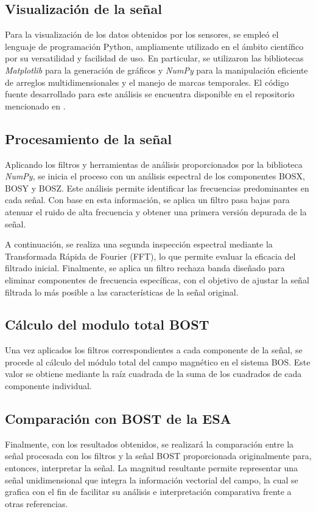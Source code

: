 \documentclass[letterpaper,11pt]{article}
\begin{document}
        \subsection{Visualización de la señal}
	Para la visualización de los datos obtenidos por los sensores, se empleó el lenguaje de programación Python, ampliamente utilizado en el ámbito científico por su versatilidad y facilidad de uso. En particular, se utilizaron las bibliotecas \textit{Matplotlib} para la generación de gráficos y \textit{NumPy} para la manipulación eficiente de arreglos multidimensionales y el manejo de marcas temporales. El código fuente desarrollado para este análisis se encuentra disponible en el repositorio mencionado en \cite{repogithub}.

        \subsection{Procesamiento de la señal}
	Aplicando los filtros y herramientas de análisis proporcionados por la biblioteca \textit{NumPy}, se inicia el proceso con un análisis espectral de los componentes BOSX, BOSY y BOSZ. Este análisis permite identificar las frecuencias predominantes en cada señal. Con base en esta información, se aplica un filtro pasa bajas para atenuar el ruido de alta frecuencia y obtener una primera versión depurada de la señal.

        A continuación, se realiza una segunda inspección espectral mediante la Transformada Rápida de Fourier (FFT), lo que permite evaluar la eficacia del filtrado inicial. Finalmente, se aplica un filtro rechaza banda diseñado para eliminar componentes de frecuencia específicas, con el objetivo de ajustar la señal filtrada lo más posible a las características de la señal original.

        \subsection{Cálculo del modulo total BOST}
        Una vez aplicados los filtros correspondientes a cada componente de la señal, se procede al cálculo del módulo total del campo magnético en el sistema BOS. Este valor se obtiene mediante la raíz cuadrada de la suma de los cuadrados de cada componente individual.

        \subsection{Comparación con BOST de la ESA}
        Finalmente, con los resultados obtenidos, se realizará la comparación entre la señal procesada con los filtros y la señal BOST proporcionada originalmente para, entonces, interpretar la señal. La magnitud resultante permite representar una señal unidimensional que integra la información vectorial del campo, la cual se grafica con el fin de facilitar su análisis e interpretación comparativa frente a otras referencias.
\end{document}

